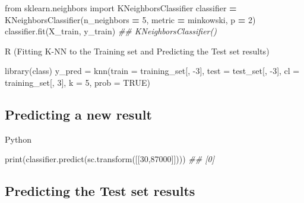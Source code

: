 \documentclass[
]{book}
\newenvironment{Shaded}{\begin{snugshade}}{\end{snugshade}}
\newcommand{\AttributeTok}[1]{\textcolor[rgb]{0.77,0.63,0.00}{#1}}
\newcommand{\BuiltInTok}[1]{#1}
\newcommand{\CommentTok}[1]{\textcolor[rgb]{0.56,0.35,0.01}{\textit{#1}}}
\newcommand{\ConstantTok}[1]{\textcolor[rgb]{0.00,0.00,0.00}{#1}}
\newcommand{\DecValTok}[1]{\textcolor[rgb]{0.00,0.00,0.81}{#1}}
\newcommand{\FunctionTok}[1]{\textcolor[rgb]{0.00,0.00,0.00}{#1}}
\newcommand{\ImportTok}[1]{#1}
\newcommand{\NormalTok}[1]{#1}
\newcommand{\OperatorTok}[1]{\textcolor[rgb]{0.81,0.36,0.00}{\textbf{#1}}}
\newcommand{\OtherTok}[1]{\textcolor[rgb]{0.56,0.35,0.01}{#1}}
\newcommand{\SpecialCharTok}[1]{\textcolor[rgb]{0.00,0.00,0.00}{#1}}
\newcommand{\StringTok}[1]{\textcolor[rgb]{0.31,0.60,0.02}{#1}}
\theoremstyle{definition}
\theoremstyle{definition}
\theoremstyle{definition}
\theoremstyle{definition}
\theoremstyle{remark}
\begin{document}
\begin{Shaded}
\begin{Highlighting}[]
\ImportTok{from}\NormalTok{ sklearn.neighbors }\ImportTok{import}\NormalTok{ KNeighborsClassifier}
\NormalTok{classifier }\OperatorTok{=}\NormalTok{ KNeighborsClassifier(n\_neighbors }\OperatorTok{=} \DecValTok{5}\NormalTok{, metric }\OperatorTok{=} \StringTok{\textquotesingle{}minkowski\textquotesingle{}}\NormalTok{, p }\OperatorTok{=} \DecValTok{2}\NormalTok{)}
\NormalTok{classifier.fit(X\_train, y\_train)}
\CommentTok{\#\# KNeighborsClassifier()}
\end{Highlighting}
\end{Shaded}

R (Fitting K-NN to the Training set and Predicting the Test set results)

\begin{Shaded}
\begin{Highlighting}[]
\FunctionTok{library}\NormalTok{(class)}
\NormalTok{y\_pred }\OtherTok{=} \FunctionTok{knn}\NormalTok{(}\AttributeTok{train =}\NormalTok{ training\_set[, }\SpecialCharTok{{-}}\DecValTok{3}\NormalTok{],}
             \AttributeTok{test =}\NormalTok{ test\_set[, }\SpecialCharTok{{-}}\DecValTok{3}\NormalTok{],}
             \AttributeTok{cl =}\NormalTok{ training\_set[, }\DecValTok{3}\NormalTok{],}
             \AttributeTok{k =} \DecValTok{5}\NormalTok{,}
             \AttributeTok{prob =} \ConstantTok{TRUE}\NormalTok{)}
\end{Highlighting}
\end{Shaded}

\hypertarget{predicting-a-new-result-4}{%
\subsection{Predicting a new result}\label{predicting-a-new-result-4}}

Python

\begin{Shaded}
\begin{Highlighting}[]
\BuiltInTok{print}\NormalTok{(classifier.predict(sc.transform([[}\DecValTok{30}\NormalTok{,}\DecValTok{87000}\NormalTok{]])))}
\CommentTok{\#\# [0]}
\end{Highlighting}
\end{Shaded}

\hypertarget{predicting-the-test-set-results-3}{%
\subsection{Predicting the Test set results}\label{predicting-the-test-set-results-3}}
\end{document}
